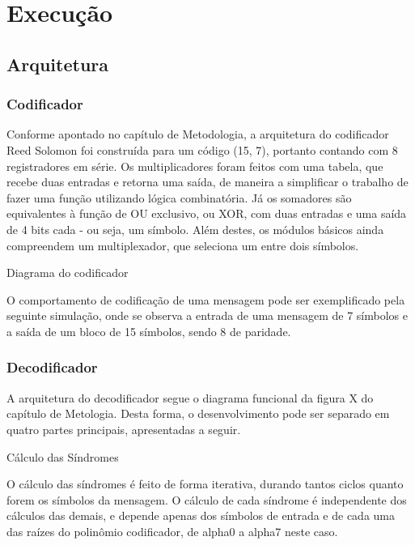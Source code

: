 	\chapter{Execução}\label{cap-execucao}
	
	\section{Arquitetura}
	
	\subsection{Codificador}
	
	Conforme apontado no capítulo de Metodologia, a arquitetura do codificador Reed Solomon foi construída para um código (15, 7), portanto contando com 8 registradores em série. Os multiplicadores foram feitos com uma tabela,  que recebe duas entradas e retorna uma saída, de maneira a simplificar o trabalho de fazer uma função utilizando lógica combinatória. Já os somadores são equivalentes à função de OU exclusivo, ou XOR, com duas entradas e uma saída de 4 bits cada - ou seja, um símbolo. Além destes, os módulos básicos ainda compreendem um multiplexador, que seleciona um entre dois símbolos.
	
	Diagrama do codificador
	
	O comportamento de codificação de uma mensagem pode ser exemplificado pela seguinte simulação, onde se observa a entrada de uma mensagem de 7 símbolos e a saída de um bloco de 15 símbolos, sendo 8 de paridade.	
	
	
	\subsection{Decodificador}
	
	A arquitetura do decodificador segue o diagrama funcional da figura X do capítulo de Metologia. Desta forma, o desenvolvimento pode ser separado em quatro partes principais, apresentadas a seguir.
	
	Cálculo das Síndromes
	
	O cálculo das síndromes é feito de forma iterativa, durando tantos ciclos quanto forem os símbolos da mensagem. O cálculo de cada síndrome é independente dos cálculos das demais, e depende apenas dos símbolos de entrada e de cada uma das raízes do polinômio codificador, de alpha0 a alpha7 neste caso.
	
